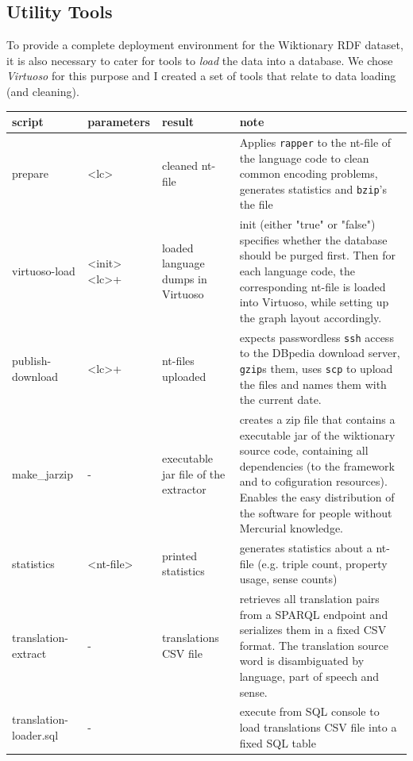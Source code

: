 \subsection{Utility Tools}
To provide a complete deployment environment for the Wiktionary RDF dataset, it is also necessary to cater for tools to \textit{load} the data into a database. We chose \textit{Virtuoso} for this purpose and I created a set of tools that relate to data loading (and cleaning).

\begin{footnotesize}
\begin{tabular}{|p{}|p{}|p{}|p{}|}
\hline \textbf{script} & \textbf{parameters} & \textbf{result} & \textbf{note} \\ 
\hline prepare & <lc> & cleaned nt-file & Applies \texttt{rapper} to the nt-file of the language code to clean common encoding problems, generates statistics and \texttt{bzip}'s the file \\ 
\hline virtuoso-load & <init> <lc>+ & loaded language dumps in Virtuoso & init (either "true" or "false") specifies whether the database should be purged first. Then for each language code, the corresponding nt-file is loaded into Virtuoso, while setting up the graph layout accordingly. \\
\hline publish-download & <lc>+ & nt-files uploaded &  expects passwordless \texttt{ssh} access to the DBpedia download server, \texttt{gzip}s them, uses \texttt{scp} to upload the files and names them with the current date.\\
\hline make\_jarzip & - & executable jar file of the extractor & creates a zip file that contains a executable jar of the wiktionary source code, containing all dependencies (to the framework and to cofiguration resources). Enables the easy distribution of the software for people without Mercurial knowledge.\\
\hline statistics & <nt-file> & printed statistics & generates statistics about a nt-file (e.g. triple count, property usage, sense counts)\\
\hline translation-extract & - & translations CSV file & retrieves all translation pairs from a SPARQL endpoint and serializes them in a fixed CSV format. The translation source word is disambiguated by language, part of speech and sense.\\
\hline translation-loader.sql  & - &  & execute from SQL console to load translations CSV file into a fixed SQL table \\
\hline 
\end{tabular} 
\end{footnotesize}

